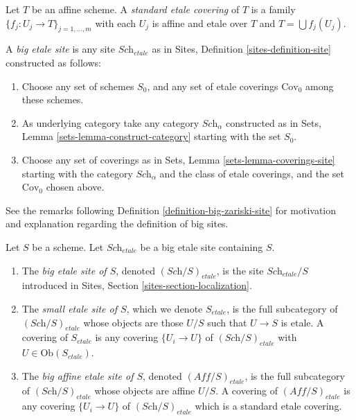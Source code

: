 \begin{definition}
\label{definition-standard-etale}
Let $T$ be an affine scheme. A {\it standard etale covering}
of $T$ is a family $\{f_j : U_j \to T\}_{j = 1, \ldots, m}$
with each $U_j$ is affine and etale over $T$ and
$T = \bigcup f_j(U_j)$.
\end{definition}

\begin{definition}
\label{definition-big-etale-site}
A {\it big etale site} is any site $\textit{Sch}_{etale}$ as in
Sites, Definition \ref{sites-definition-site} constructed as follows:
\begin{enumerate}
\item Choose any set of schemes $S_0$, and any set of etale coverings
$\text{Cov}_0$ among these schemes.
\item As underlying category take any category $\textit{Sch}_\alpha$
constructed as in Sets, Lemma \ref{sets-lemma-construct-category}
starting with the set $S_0$.
\item Choose any set of coverings as in
Sets, Lemma \ref{sets-lemma-coverings-site} starting with the
category $\textit{Sch}_\alpha$ and the class of etale coverings,
and the set $\text{Cov}_0$ chosen above.
\end{enumerate}
\end{definition}

\noindent
See the remarks following Definition \ref{definition-big-zariski-site}
for motivation and explanation regarding the definition of big sites.

\begin{definition}
\label{definition-big-small-etale}
Let $S$ be a scheme. Let $\textit{Sch}_{etale}$ be a big etale
site containing $S$.
\begin{enumerate}
\item The {\it big etale site of $S$}, denoted
$(\textit{Sch}/S)_{etale}$, is the site $\textit{Sch}_{etale}/S$
introduced in Sites, Section \ref{sites-section-localization}.
\item The {\it small etale site of $S$}, which we denote
$S_{etale}$, is the full subcategory of $(\textit{Sch}/S)_{etale}$
whose objects are those $U/S$ such that $U \to S$ is etale.
A covering of $S_{etale}$ is any covering $\{U_i \to U\}$ of
$(\textit{Sch}/S)_{etale}$ with $U \in \text{Ob}(S_{etale})$.
\item The {\it big affine etale site of $S$}, denoted
$(\textit{Aff}/S)_{etale}$, is the full subcategory of
$(\textit{Sch}/S)_{etale}$ whose objects are affine $U/S$.
A covering of $(\textit{Aff}/S)_{etale}$ is any covering
$\{U_i \to U\}$ of $(\textit{Sch}/S)_{etale}$ which is a
standard etale covering.
\end{enumerate}
\end{definition}

